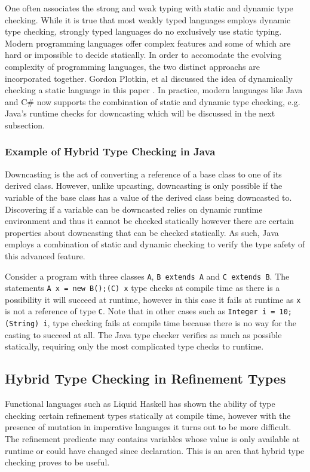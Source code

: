 \documentclass[a4paper,12pt]{report}
\begin{document}
\par
One often associates the strong and weak typing with static and dynamic type 
checking. While it is true that most weakly typed languages employs dynamic  
type checking, strongly typed languages do no exclusively use static typing. 
Modern programming languages offer complex features and some of which are hard 
or impossible to decide statically. In order to accomodate the evolving 
complexity of programming languages, the two distinct approachs are 
incorporated together. Gordon Plotkin, et al discussed the 
idea of dynamically checking a static language in this paper 
\cite{dynamicCheckStaticLanguage}. In practice, modern languages like 
Java and C# now supports the combination of static and dynamic type checking, 
e.g. Java's runtime checks for downcasting which will be 
discussed in the next subsection.

\subsubsection{Example of Hybrid Type Checking in Java} 
Downcasting is the act of converting a reference of a base class to one of its 
derived class. However, unlike upcasting, downcasting is only possible if the 
variable of the base class has a value of the derived class being downcasted to. 
Discovering if a variable can be downcasted relies on dynamic runtime 
environment and thus it cannot be checked statically however there are certain 
properties about downcasting that can be checked statically. As such, 
Java employs a combination of static and dynamic checking 
to verify the type safety of this advanced feature. 

\par
Consider a program with three classes \verb|A|, \verb|B extends A| and 
\verb|C extends B|. The statements \verb|A x = new B();(C) x| 
type checks at compile time as there is a possibility it will succeed at 
runtime, however in this case it fails at runtime as \verb|x| is not a reference of 
type \verb|C|. Note that in other cases such as \verb|Integer i = 10; (String) i|, 
type checking fails at compile time because there is no way for the casting to 
succeed at all. The Java type checker verifies as much as possible 
statically, requiring only the most complicated type checks to runtime. 

\subsection{Hybrid Type Checking in Refinement Types} \label{section:htc_ref}
Functional languages such as Liquid Haskell has shown the ability of type 
checking certain refinement types statically at compile time, however with the 
presence of mutation in imperative languages it turns out to be more difficult. 
The refinement predicate may contains variables whose value is only available 
at runtime or could have changed since declaration. This is an area that hybrid 
type checking proves to be useful. 
\end{document}
